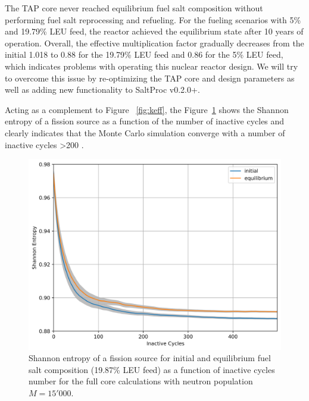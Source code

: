 \documentclass[12pt]{article} %
\begin{document}
The \gls{TAP} core never reached equilibrium fuel salt composition without 
performing fuel salt reprocessing and refueling. For the fueling scenarios 
with 5\% and 19.79\% \gls{LEU} feed, the reactor achieved the equilibrium 
state after 10 years of operation. Overall, the effective multiplication 
factor gradually decreases from the initial 1.018 to 0.88 for the 19.79\% 
\gls{LEU} feed and 0.86 for the 5\% \gls{LEU} feed, which indicates 
problems with operating this nuclear reactor design. We will try to overcome 
this issue by re-optimizing the \gls{TAP} core and design parameters as well 
as adding new functionality to SaltProc v0.2.0+.

Acting as a complement to Figure ~\ref{fig:keff}, the Figure~\ref{fig:shannon} 
shows the Shannon entropy of a fission source as a function of the number of 
inactive cycles and clearly indicates that the Monte Carlo simulation 
converge with a number of inactive cycles >200 
\cite{brown_k-effective_2011}. 
\begin{figure}[htp!] %
  \centering
		  \includegraphics[width=\textwidth]{h_src.png}
	 \vspace{-0.35in}
  \caption{Shannon entropy of a fission source for initial and equilibrium 
  fuel salt composition (19.87\% \gls{LEU} feed) as a function of inactive 
  cycles number for the full core calculations with neutron population $M=15'000$.}
  \label{fig:shannon}
\end{figure}
\end{document}
